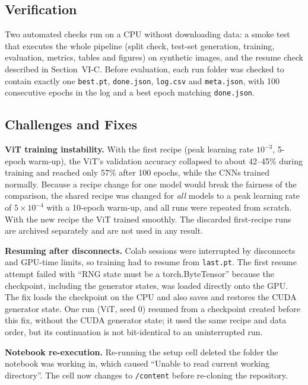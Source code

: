 \documentclass[conference]{IEEEtran}
\begin{document}
\subsection{Verification}
Two automated checks run on a CPU without downloading data: a smoke test that executes the whole pipeline (split check, test-set generation, training, evaluation, metrics, tables and figures) on synthetic images, and the resume check described in Section~VI-C. Before evaluation, each run folder was checked to contain exactly one \texttt{best.pt}, \texttt{done.json}, \texttt{log.csv} and \texttt{meta.json}, with 100 consecutive epochs in the log and a best epoch matching \texttt{done.json}.

\subsection{Challenges and Fixes}
\textbf{ViT training instability.} With the first recipe (peak learning rate $10^{-3}$, 5-epoch warm-up), the ViT's validation accuracy collapsed to about 42--45\% during training and reached only 57\% after 100 epochs, while the CNNs trained normally. Because a recipe change for one model would break the fairness of the comparison, the shared recipe was changed for \emph{all} models to a peak learning rate of $5\times10^{-4}$ with a 10-epoch warm-up, and all runs were repeated from scratch. With the new recipe the ViT trained smoothly. The discarded first-recipe runs are archived separately and are not used in any result.

\textbf{Resuming after disconnects.} Colab sessions were interrupted by disconnects and GPU-time limits, so training had to resume from \texttt{last.pt}. The first resume attempt failed with ``RNG state must be a torch.ByteTensor'' because the checkpoint, including the generator states, was loaded directly onto the GPU. The fix loads the checkpoint on the CPU and also saves and restores the CUDA generator state. One run (ViT, seed 0) resumed from a checkpoint created before this fix, without the CUDA generator state; it used the same recipe and data order, but its continuation is not bit-identical to an uninterrupted run.

\textbf{Notebook re-execution.} Re-running the setup cell deleted the folder the notebook was working in, which caused ``Unable to read current working directory''. The cell now changes to \texttt{/content} before re-cloning the repository.
\end{document}

